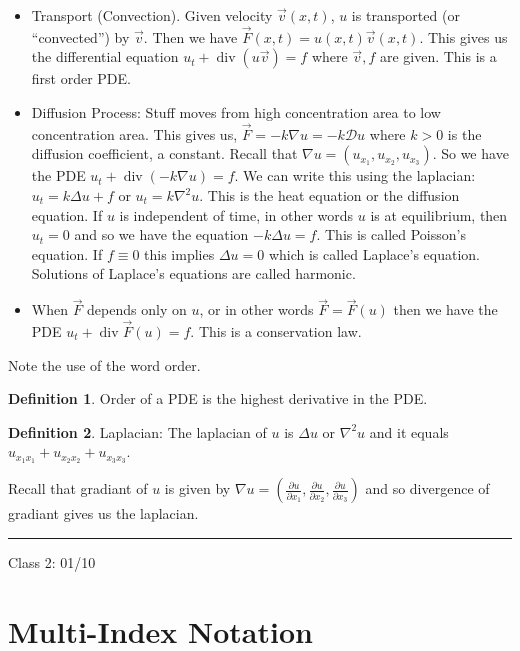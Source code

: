 \documentclass{article}
\theoremstyle{definition}
\newtheorem{definition}{Definition}
\begin{document}
\begin{itemize}
    \item Transport (Convection). Given velocity \(\vec{v} (x,t)\), \(u\) is transported (or ``convected'') by \(\vec{v} \). Then we have \(\vec{F} (x,t)=u(x,t)\vec{v} (x,t)\). This gives us the differential equation \(u_{t} +\operatorname{div}(u \vec{v}) = f \) where \(\vec{v} ,f\) are given. This is a first order PDE.
    \item Diffusion Process: Stuff moves from high concentration area to low concentration area. This gives us, \(\vec{F} = - k\nabla u=-k \mathcal{D} u\) where \(k>0\) is the diffusion coefficient, a constant. Recall that \(\nabla u = (u_{x_1}, u_{x_2}, u_{x_3})\). So we have the PDE \(u_{t} +\operatorname{div}(-k\nabla u) = f\). We can write this using the laplacian: \(u_{t} = k \Delta u + f\) or \(u_{t} = k\nabla^2 u\). This is the heat equation or the diffusion equation. If \(u\) is independent of time, in other words \(u\) is at equilibrium, then \(u_{t} =0\) and so we have the equation \(-k \Delta u=f\). This is called Poisson's equation. If \(f \equiv 0\) this implies \(\Delta u=0\) which is called Laplace's equation. Solutions of Laplace's equations are called harmonic.
    \item When \(\vec{F} \) depends only on \(u\), or in other words \(\vec{F} =\vec{F} (u)\) then we have the PDE \(u_{t} +\operatorname{div} \vec{F} (u) = f\). This is a conservation law. 
\end{itemize}

Note the use of the word order.

\begin{definition}
    Order of a PDE is the highest derivative in the PDE.
\end{definition}

\begin{definition}
    Laplacian: The laplacian of \(u\) is \(\Delta u\) or \(\nabla^2 u\) and it equals \(u_{x_1 x_1} + u_{x_2 x_2} + u_{x_3 x_3}\).
\end{definition}

Recall that gradiant of \(u\) is given by \(\nabla u = \left( \frac{\partial u}{\partial x_1} , \frac{\partial u}{\partial x_2} , \frac{\partial u}{\partial x_3}   \right) \) and so divergence of gradiant gives us the laplacian.

\hrule
\hfil

Class 2: 01/10

\section*{Multi-Index Notation}
\end{document}
